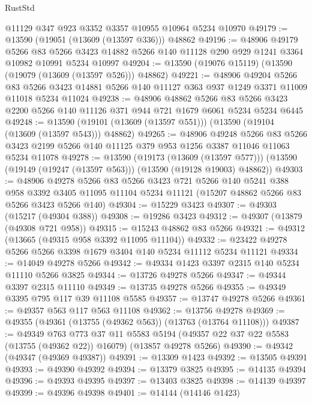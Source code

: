 \begin{lexlean}{RustStd}
\begin{coremodule}
    @11129
    @347
    @923
    @3352
    @3357
    @10955
    @10964
    @5234
    @10970
@49179 := @13590 (@19051 (@13609 (@13597 @336))) @48862
@49196 := @48906
    @49179
    @5266
    @83
    @5266
    @3423
    @14882
    @5266
    @140
    @11128
    @290
    @929
    @1241
    @3364
    @10982
    @10991
    @5234
    @10997
@49204 := @13590 (@19076 @15119) (@13590 (@19079 (@13609 (@13597 @526))) @48862)
@49221 := @48906
    @49204
    @5266
    @83
    @5266
    @3423
    @14881
    @5266
    @140
    @11127
    @363
    @937
    @1249
    @3371
    @11009
    @11018
    @5234
    @11024
@49238 := @48906
    @48862
    @5266
    @83
    @5266
    @3423
    @2200
    @5266
    @140
    @11126
    @371
    @944
    @721
    @1679
    @6061
    @5234
    @5234
    @6445
@49248 := @13590 (@19101 (@13609 (@13597 @551))) (@13590 (@19104 (@13609 (@13597 @543))) @48862)
@49265 := @48906
    @49248
    @5266
    @83
    @5266
    @3423
    @2199
    @5266
    @140
    @11125
    @379
    @953
    @1256
    @3387
    @11046
    @11063
    @5234
    @11078
@49278 := @13590
    (@19173 (@13609 (@13597 @577)))
    (@13590 (@19149 (@19247 (@13597 @563))) (@13590 (@19128 @19003) @48862))
@49303 := @48906
    @49278
    @5266
    @83
    @5266
    @3423
    @721
    @5266
    @140
    @5241
    @388
    @958
    @3392
    @3405
    @11095
    @11104
    @5234
    @11121
    (@15207 @48862 @5266 @83 @5266 @3423 @5266 @140)
@49304 := @15229 @3423
@49307 := @49303 (@15217 (@49304 @388))
@49308 := @19286 @3423
@49312 := @49307 (@13879 (@49308 @721 @958))
@49315 := @15243 @48862 @83 @5266
@49321 := @49312 (@13665 (@49315 @958 @3392 @11095 @11104))
@49332 := @23422 @49278 @5266 @5266 @3398 @1679 @3404 @140 @5234 @11112 @5234 @11121
@49334 := @14049 @49278 @5266
@49342 := @49334 @1423 @3397 @2315 @140 @5234 @11110 @5266 @3825
@49344 := @13726 @49278 @5266
@49347 := @49344 @3397 @2315 @11110
@49349 := @13735 @49278 @5266
@49355 := @49349 @3395 @795 @117 @39 @11108 @5585
@49357 := @13747 @49278 @5266
@49361 := @49357 @563 @117 @563 @11108
@49362 := @13756 @49278
@49369 := @49355 (@49361 (@13755 (@49362 @563)) (@13763 (@13764 @11108)))
@49387 := @49349
    @763
    @773
    @37
    @11
    @5583
    @5194
    (@49357 @22 @37 @22 @5583 (@13755 (@49362 @22)) @16079)
    (@13857 @49278 @5266)
@49390 := @49342 (@49347 (@49369 @49387))
@49391 := @13309 @1423
@49392 := @13505 @49391
@49393 := @49390 @49392
@49394 := @13379 @3825
@49395 := @14135 @49394
@49396 := @49393 @49395
@49397 := @13403 @3825
@49398 := @14139 @49397
@49399 := @49396 @49398
@49401 := @14144 (@14146 @1423)

\end{coremodule}
\end{lexlean}
